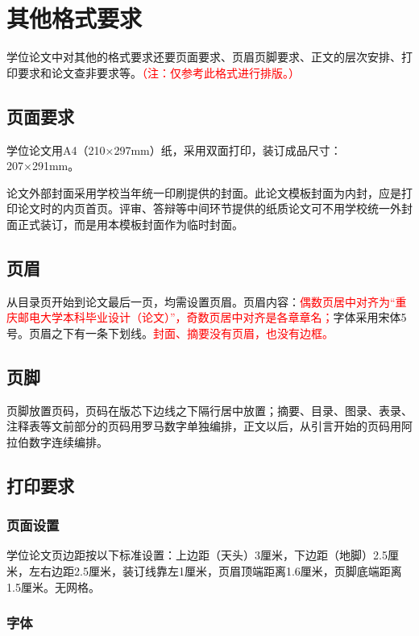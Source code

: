 \chapter{其他格式要求}

学位论文中对其他的格式要求还要页面要求、页眉页脚要求、正文的层次安排、打印要求和论文查非要求等。\textcolor{red}{（注：仅参考此格式进行排版。）}

\section{页面要求}

学位论文用A4（210×297mm）纸，采用双面打印，装订成品尺寸：207×291mm。

论文外部封面采用学校当年统一印刷提供的封面。此论文模板封面为内封，应是打印论文时的内页首页。评审、答辩等中间环节提供的纸质论文可不用学校统一外封面正式装订，而是用本模板封面作为临时封面。

\section{页眉}

从目录页开始到论文最后一页，均需设置页眉。页眉内容：\textcolor{red}{偶数页居中对齐为“重庆邮电大学本科毕业设计（论文）”，奇数页居中对齐是各章章名；}字体采用宋体5号。页眉之下有一条下划线。\textcolor{red}{封面、摘要没有页眉，也没有边框。}

\section{页脚}

页脚放置页码，页码在版芯下边线之下隔行居中放置；摘要、目录、图录、表录、注释表等文前部分的页码用罗马数字单独编排，正文以后，从引言开始的页码用阿拉伯数字连续编排。

\section{打印要求}
\subsection{页面设置}

学位论文页边距按以下标准设置：上边距（天头）3厘米，下边距（地脚）2.5厘米，左右边距2.5厘米，装订线靠左1厘米，页眉顶端距离1.6厘米，页脚底端距离1.5厘米。无网格。

\subsection{字体}

